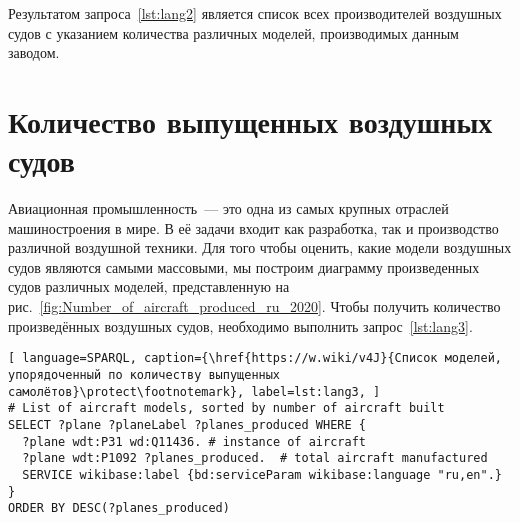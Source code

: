
Результатом запроса~\ref{lst:lang2} является список всех производителей воздушных судов с указанием количества различных моделей, производимых данным заводом.

\section{Количество выпущенных воздушных судов}

Авиационная промышленность~--- это одна из самых крупных отраслей машиностроения в мире. 
В её задачи входит как разработка, так и производство различной воздушной техники. 
Для того чтобы оценить, какие модели воздушных судов являются самыми массовыми, 
мы построим диаграмму произведенных судов различных моделей, представленную на рис.~\ref{fig:Number_of_aircraft_produced_ru_2020}. 
Чтобы получить количество произведённых воздушных судов, необходимо выполнить запрос~\ref{lst:lang3}.

\begin{lstlisting}[ language=SPARQL, caption={\href{https://w.wiki/v4J}{Список моделей, упорядоченный по количеству выпущенных самолётов}\protect\footnotemark}, label=lst:lang3, ]
# List of aircraft models, sorted by number of aircraft built
SELECT ?plane ?planeLabel ?planes_produced WHERE {
  ?plane wdt:P31 wd:Q11436. # instance of aircraft
  ?plane wdt:P1092 ?planes_produced.  # total aircraft manufactured
  SERVICE wikibase:label {bd:serviceParam wikibase:language "ru,en".}
}
ORDER BY DESC(?planes_produced)
\end{lstlisting}


